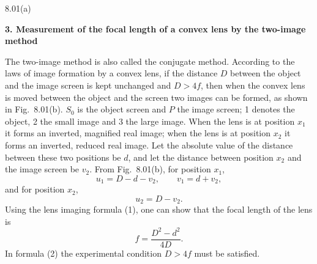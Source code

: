 \begin{figbox}{8.01(a)}
\end{figbox}

\textbf{3. Measurement of the focal length of a convex lens by the two-image method}

The two-image method is also called the conjugate method. According to the laws of image formation by a convex lens, if the distance $D$ between the object and the image screen is kept unchanged and $D>4f$, then when the convex lens is moved between the object and the screen two images can be formed, as shown in Fig.~8.01(b). $S_0$ is the object screen and $P$ the image screen; 1 denotes the object, 2 the small image and 3 the large image. When the lens is at position $x_1$ it forms an inverted, magnified real image; when the lens is at position $x_2$ it forms an inverted, reduced real image. Let the absolute value of the distance between these two positions be $d$, and let the distance between position $x_2$ and the image screen be $v_2$. From Fig.~8.01(b), for position $x_1$,
\[
u_1=D-d-v_2,\qquad v_1=d+v_2,
\]
and for position $x_2$,
\[
u_2=D-v_2.
\]
Using the lens imaging formula (1), one can show that the focal length of the lens is
\begin{equation}
f=\frac{D^2-d^2}{4D}. \tag{2}
\end{equation}
In formula (2) the experimental condition $D>4f$ must be satisfied.

